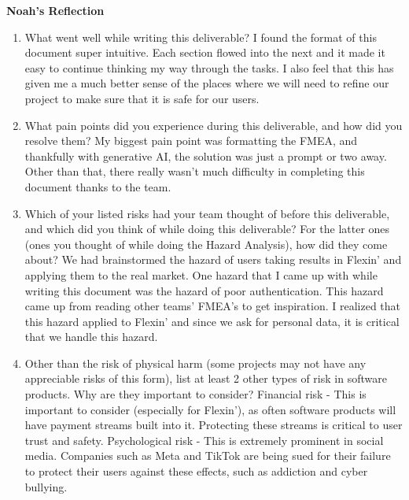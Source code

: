 \documentclass{article}
\begin{document}
\vspace{1em}
\noindent
\textbf{Noah's Reflection}
\begin{enumerate}
    \item What went well while writing this deliverable? \newline
    I found the format of this document super intuitive.
    Each section flowed into the next and it made it easy to continue thinking my way through the tasks.
    I also feel that this has given me a much better sense of the places where we will need to refine our project to make sure that it is safe for our users.
    \item What pain points did you experience during this deliverable, and how
    did you resolve them? \newline
    My biggest pain point was formatting the FMEA, and thankfully with generative AI, the solution was just a prompt or two away.
    Other than that, there really wasn't much difficulty in completing this document thanks to the team.
    \item Which of your listed risks had your team thought of before this
    deliverable, and which did you think of while doing this deliverable? For
    the latter ones (ones you thought of while doing the Hazard Analysis), how
    did they come about? \newline
    We had brainstormed the hazard of users taking results in Flexin' and applying them to the real market.
    One hazard that I came up with while writing this document was the hazard of poor authentication.
    This hazard came up from reading other teams' FMEA's to get inspiration.
    I realized that this hazard applied to Flexin' and since we ask for personal data, it is critical that we handle this hazard.
    \item Other than the risk of physical harm (some projects may not have any
    appreciable risks of this form), list at least 2 other types of risk in
    software products. Why are they important to consider? \newline
    Financial risk - This is important to consider (especially for Flexin'), as often software products will have payment streams built into it. Protecting these streams is critical to user trust and safety. \newline
    Psychological risk - This is extremely prominent in social media. Companies such as Meta and TikTok are being sued for their failure to protect their users against these effects, such as addiction and cyber bullying.
\end{enumerate}
\end{document}
